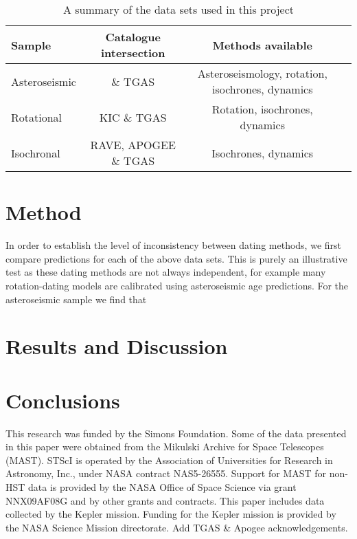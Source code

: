 \documentclass[useAMS, usenatbib, preprint, 12pt]{aastex}
\newcommand{\racomment}[1]{{\color{red}#1}}
\begin{document}
\begin{landscape}
\begin{table}
\begin{center}
\caption{A summary of the data sets used in this project}
\begin{tabular}{lccc}
    Sample & Catalogue intersection &  Methods available \\
    \hline
    Asteroseismic & \citet{Chaplin2014} \& TGAS & Asteroseismology, rotation,
    isochrones, dynamics \\
    Rotational & KIC \& TGAS & Rotation, isochrones, dynamics \\
    Isochronal & RAVE, APOGEE \& TGAS & Isochrones, dynamics \\
\end{tabular}
\end{center}
\end{table}
\label{tab:data}
\end{landscape}

\section{Method}
\label{sec:method}

In order to establish the level of inconsistency between dating methods, we
first compare predictions for each of the above data sets.
This is purely an illustrative test as these dating methods are not always
independent, for example many rotation-dating models are calibrated using
asteroseismic age predictions.
For the asteroseismic sample we find that

\section{Results and Discussion}
\label{sec:results}

\section{Conclusions}

This research was funded by the Simons Foundation.
Some of the data presented in this paper were obtained from the Mikulski
Archive for Space Telescopes (MAST).
STScI is operated by the Association of Universities for Research in
Astronomy, Inc., under NASA contract NAS5-26555.
Support for MAST for non-HST data is provided by the NASA Office of Space
Science via grant NNX09AF08G and by other grants and contracts.
This paper includes data collected by the Kepler mission. Funding for the
Kepler mission is provided by the NASA Science Mission directorate.
\racomment{Add TGAS \& Apogee acknowledgements.}



\end{document}

